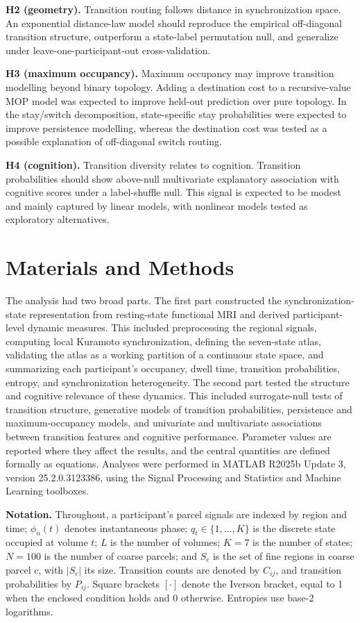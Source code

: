 \documentclass[12pt,a4paper]{report}
\begin{document}
\textbf{H2 (geometry).} Transition routing follows distance in synchronization space. An exponential distance-law model should reproduce the empirical off-diagonal transition structure, outperform a state-label permutation null, and generalize under leave-one-participant-out cross-validation.

\textbf{H3 (maximum occupancy).} Maximum occupancy may improve transition modelling beyond binary topology. Adding a destination cost to a recursive-value MOP model was expected to improve held-out prediction over pure topology. In the stay/switch decomposition, state-specific stay probabilities were expected to improve persistence modelling, whereas the destination cost was tested as a possible explanation of off-diagonal switch routing.


\textbf{H4 (cognition).} Transition diversity relates to cognition. Transition probabilities should show above-null multivariate explanatory association with cognitive scores under a label-shuffle null. This signal is expected to be modest and mainly captured by linear models, with nonlinear models tested as exploratory alternatives.


\chapter{Materials and Methods}
The analysis had two broad parts. The first part constructed the synchronization-state representation from resting-state functional MRI and derived participant-level dynamic measures. This included preprocessing the regional signals, computing local Kuramoto synchronization, defining the seven-state atlas, validating the atlas as a working partition of a continuous state space, and summarizing each participant's occupancy, dwell time, transition probabilities, entropy, and synchronization heterogeneity. The second part tested the structure and cognitive relevance of these dynamics. This included surrogate-null tests of transition structure, generative models of transition probabilities, persistence and maximum-occupancy models, and univariate and multivariate associations between transition features and cognitive performance. Parameter values are reported where they affect the results, and the central quantities are defined formally as equations. Analyses were performed in MATLAB R2025b Update 3, version 25.2.0.3123386, using the Signal Processing and Statistics and Machine Learning toolboxes.

\textbf{Notation.} Throughout, a participant's parcel signals are indexed by region and time; $\phi_n(t)$ denotes instantaneous phase; $q_t \in \{1, \ldots, K\}$ is the discrete state occupied at volume $t$; $L$ is the number of volumes; $K = 7$ is the number of states; $N = 100$ is the number of coarse parcels; and $S_c$ is the set of fine regions in coarse parcel $c$, with $|S_c|$ its size. Transition counts are denoted by $C_{ij}$, and transition probabilities by $P_{ij}$. Square brackets $[\cdot]$ denote the Iverson bracket, equal to 1 when the enclosed condition holds and 0 otherwise. Entropies use base-2 logarithms.
\end{document}
